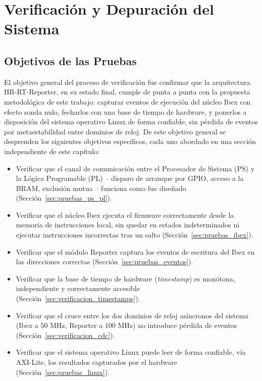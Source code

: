 \chapter{Verificación y Depuración del Sistema}
\label{ch:resultados}

\section{Objetivos de las Pruebas}
\label{sec:objetivos_pruebas}

El objetivo general del proceso de verificación fue confirmar que la
arquitectura HR-RT-Reporter, en su estado final, cumple de punta a punta
con la propuesta metodológica de este trabajo: capturar eventos de
ejecución del núcleo Ibex con efecto sonda nulo, fecharlos con una base de
tiempo de hardware, y ponerlos a disposición del sistema operativo Linux
de forma confiable, sin pérdida de eventos por metaestabilidad entre
dominios de reloj. De este objetivo general se desprenden los siguientes
objetivos específicos, cada uno abordado en una sección independiente de
este capítulo:

\begin{itemize}
    \item Verificar que el canal de comunicación entre el Procesador de
    Sistema (PS) y la Lógica Programable (PL) -- disparo de arranque por
    GPIO, acceso a la BRAM, exclusión mutua -- funciona como fue diseñado
    (Sección~\ref{sec:pruebas_ps_pl}).
    \item Verificar que el núcleo Ibex ejecuta el firmware correctamente
    desde la memoria de instrucciones local, sin quedar en estados
    indeterminados ni ejecutar instrucciones incorrectas tras un salto
    (Sección~\ref{sec:pruebas_ibex}).
    \item Verificar que el módulo Reporter captura los eventos de
    escritura del Ibex en las direcciones correctas
    (Sección~\ref{sec:pruebas_eventos}).
    \item Verificar que la base de tiempo de hardware (\textit{timestamp})
    es monótona, independiente y correctamente accesible
    (Sección~\ref{sec:verificacion_timestamps}).
    \item Verificar que el cruce entre los dos dominios de reloj
    asíncronos del sistema (Ibex a $50\text{ MHz}$, Reporter a
    $100\text{ MHz}$) no introduce pérdida de eventos
    (Sección~\ref{sec:verificacion_cdc}).
    \item Verificar que el sistema operativo Linux puede leer de forma
    confiable, vía AXI-Lite, los resultados capturados por el hardware
    (Sección~\ref{sec:pruebas_linux}).
\end{itemize}

